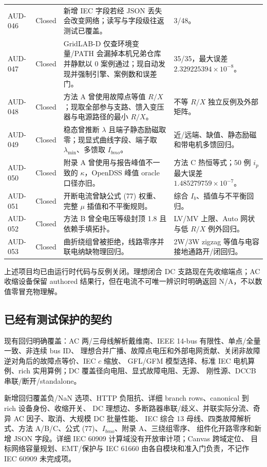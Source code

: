 \begin{center}
\begin{longtable}{@{}L{1.5cm}L{1.5cm}L{8.1cm}L{3.1cm}@{}}
AUD-046 & Closed & 新增 IEC 字段若经 JSON 丢失会改变网络；读写与字段级往返测试已覆盖。 &  3/48。\\
AUD-047 & Closed & GridLAB-D 仅查环境变量/PATH 会漏掉本机兄弟仓库并静默以 0 案例通过；现自动发现并强制引擎、案例数和误差门。 & 35/35，最大误差 $2.329225394\times10^{-8}$。\\
AUD-048 & Closed & 方法 A 曾使用故障点等值 $R/X$；现取全部参与支路、馈入变压器与电源路径的最小 $R/X$。 & 不等 $R/X$ 独立反例及外部矩阵。\\
AUD-049 & Closed & 稳态曾推断 $\lambda$ 且端子静态励磁取零；现显式曲线字段、端子取 $\lambda_{\min}$、多馈取 $I_{bmo}$。 & 近/远端、缺值、静态励磁和带电机多馈回归。\\
AUD-050 & Closed & 附录 A 曾使用与报告峰值不一致的 $\kappa$，OpenDSS 峰值 oracle 口径亦旧。 & 方法 C 热恒等式；50 例 $i_p$ 最大误差 $1.485279759\times10^{-7}$。\\
AUD-051 & Closed & 开断电流曾缺公式 (77) 权重、完整 $\mu$ 插值和不平衡规则。 & 综合 $I_b$、插值与不平衡回归。\\
AUD-052 & Closed & 方法 B 曾全电压等级封顶 1.8 且依赖手填拓扑。 & LV/MV 上限、Auto 网状与低 $R/X$ 例外回归。\\
AUD-053 & Closed & 曲折绕组曾被拒绝，线路零序并联电纳缺物理回归。 & 2W/3W zigzag 等值与电容接地通路开/闭回归。\\
\bottomrule
\end{longtable}
\end{center}

上述项目均已由运行时代码与反例关闭。理想闭合 DC 支路现在先收缩端点；AC 收缩设备保留 authored
结果行，但在电流不可唯一辨识时明确返回 N/A，不以数值零冒充物理解。

\subsection{已经有测试保护的契约}

现有回归明确覆盖：AC 两/三母线解析戴维南、IEEE 14-bus 有限性、单点/全量一致、非连续 bus ID、
理想合并广播、故障点电压和外部电网贡献、关闭非故障逆对角后的故障点等价、IEC $c$ 缩放、
GFL/GFM 模型选择、标准 IEC 电机算例、rich 实用算例；DC 覆盖径向电阻、显式故障电阻、无源、
刚性源、DCCB 串联/断开/standalone。

新增回归覆盖负/NaN 选项、HTTP 负阻抗、详细 branch rows、canonical 到 rich 设备身份、收缩开关、
DC 理想边、多断路器串联/歧义、并联实际分流、奇异 AC 因子、取消、大规模 DC 批量性能、
IEC 综合 13 母线、四类故障解析式、方法 A/B/C、公式 (77)、$I_{bmo}$、附录 A、三绕组零序、
组件化开路零序和新增 JSON 字段。详细 IEC 60909 计算域没有开放审计项；Canvas 跨域定位、
目标网络容量规划、EMT/保护与 IEC 61660 由各自模块和准入门负责，不记作 IEC 60909 未完成项。

